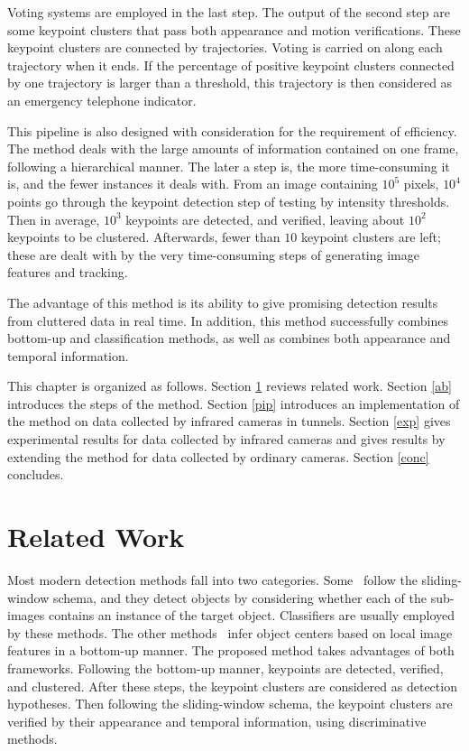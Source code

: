 Voting systems are employed in the last step. The output of the second step are some keypoint clusters that pass both appearance and motion verifications. These keypoint clusters are connected by trajectories. Voting is carried on along each trajectory when it ends. If the percentage of positive keypoint clusters connected by one trajectory is larger than a threshold, this trajectory is then considered as an emergency telephone indicator.



This pipeline is also designed  with consideration for the requirement of efficiency.  The method deals with the large amounts of information contained on one frame, following a hierarchical manner. The later a step is, the more time-consuming it is, and the fewer instances it deals with. From an image containing $10^5$ pixels, $10^4$ points go through the keypoint detection step of testing by intensity thresholds. Then in average, $10^3$ keypoints are detected, and verified, leaving about $10^2$ keypoints to be clustered. Afterwards, fewer than $10$ keypoint clusters are left; these are dealt with by the very time-consuming steps of generating image features and tracking.

The advantage of this method is its ability to give promising detection results from cluttered data in real time. In addition, this method successfully  combines bottom-up and classification methods, as well as combines both appearance and temporal information.





This chapter is organized as follows. Section \ref{rw} reviews related work. Section \ref{ab} introduces the steps of the method. Section \ref{pip} introduces an implementation of the method on data collected by infrared cameras in tunnels. Section \ref{exp} gives experimental results for data collected by infrared cameras and gives results by extending the method for data collected by ordinary cameras. Section \ref{conc} concludes.





\section{Related Work}
\label{rw}


Most modern detection methods fall into two categories. Some~\citep{ij4,ac31,ac30,ac4,ac32,ac29,ac28,ac1} follow the sliding-window schema, and they detect objects by considering whether each of the sub-images contains an instance of the target object. Classifiers are usually employed by these methods. The other methods~\citep{ac9,ac2,ac3,ac5,ac10,ac21,ac18} infer object centers based on local image features in a bottom-up manner. The proposed method takes advantages of both frameworks. Following the bottom-up manner, keypoints are detected, verified, and clustered. After these steps, the keypoint clusters are considered as detection hypotheses. Then following the sliding-window schema, the keypoint clusters are verified by their appearance and temporal information, using discriminative methods.

